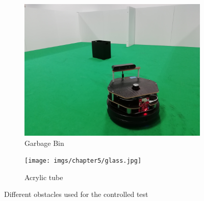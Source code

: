\begin{figure}[ht!]
\begin{subfigure}[b]{0.3\linewidth}
    \includegraphics[width=\linewidth]{imgs/chapter5/garbage.jpg}
    \caption{Garbage Bin}
    \label{fig::garbage}
  \end{subfigure}
  \begin{subfigure}[b]{0.3\linewidth}
    \texttt{[image: imgs/chapter5/glass.jpg]}
    \caption{Acrylic tube}
    \label{fig::tube}
  \end{subfigure}
  \caption{Different obstacles used for the controlled test}
  \label{fig:obstacles}
\end{figure}

